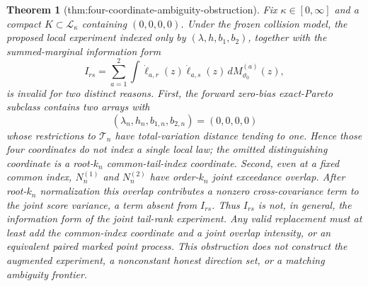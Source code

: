 \documentclass{article}
\newtheorem{theorem}{Theorem}
\begin{document}
\begin{theorem}[thm:four-coordinate-ambiguity-obstruction]\label{thm:four-coordinate-ambiguity-obstruction}
Fix \(\kappa\in[0,\infty]\) and a compact \(K\subset\mathcal L_\kappa\) containing \((0,0,0,0)\).  Under the frozen collision model, the proposed local experiment indexed only by \((\lambda,h,b_1,b_2)\), together with the summed-marginal information form
\[
 I_{rs}=\sum_{a=1}^2\int\dot\ell_{a,r}(z)\dot\ell_{a,s}(z)\,dM_{\vartheta_0}^{(a)}(z),
\]
is invalid for two distinct reasons.  First, the forward zero-bias exact-Pareto subclass contains two arrays with
\[
 (\lambda_n,h_n,b_{1,n},b_{2,n})=(0,0,0,0)
\]
whose restrictions to \(\mathcal T_n\) have total-variation distance tending to one.  Hence those four coordinates do not index a single local law; the omitted distinguishing coordinate is a root-\(k_n\) common-tail-index coordinate.  Second, even at a fixed common index, \(N_n^{(1)}\) and \(N_n^{(2)}\) have order-\(k_n\) joint exceedance overlap.  After root-\(k_n\) normalization this overlap contributes a nonzero cross-covariance term to the joint score variance, a term absent from \(I_{rs}\).  Thus \(I_{rs}\) is not, in general, the information form of the joint tail-rank experiment.  Any valid replacement must at least add the common-index coordinate and a joint overlap intensity, or an equivalent paired marked point process.  This obstruction does not construct the augmented experiment, a nonconstant honest direction set, or a matching ambiguity frontier.
\end{theorem}
\end{document}
